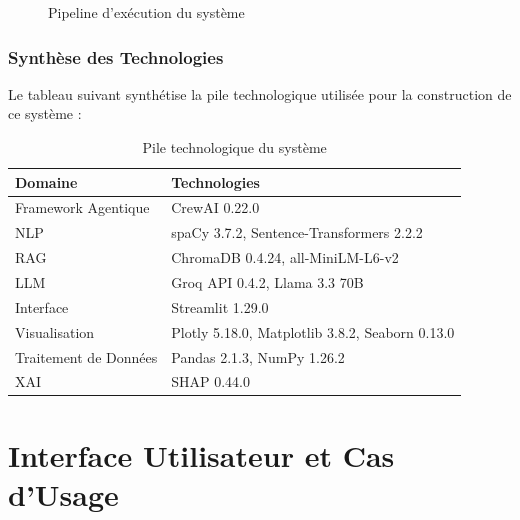 \documentclass{rapportECL}
\begin{document}
\begin{figure}[H]
\centering
{}
\caption{Pipeline d'exécution du système}
\label{fig:pipeline}
\end{figure}

\section{Synthèse des Technologies}

Le tableau suivant synthétise la pile technologique utilisée pour la construction de ce système :

\begin{table}[H]
\centering
\begin{tabular}{ll}
\toprule
\textbf{Domaine} & \textbf{Technologies} \\
\midrule
Framework Agentique & CrewAI 0.22.0 \\
NLP & spaCy 3.7.2, Sentence-Transformers 2.2.2 \\
RAG & ChromaDB 0.4.24, all-MiniLM-L6-v2 \\
LLM & Groq API 0.4.2, Llama 3.3 70B \\
Interface & Streamlit 1.29.0 \\
Visualisation & Plotly 5.18.0, Matplotlib 3.8.2, Seaborn 0.13.0 \\
Traitement de Données & Pandas 2.1.3, NumPy 1.26.2 \\
XAI & SHAP 0.44.0 \\
\bottomrule
\end{tabular}
\caption{Pile technologique du système}
\label{tab:tech_stack}
\end{table}

\newpage

\part{Interface Utilisateur et Cas d'Usage}
\end{document}
